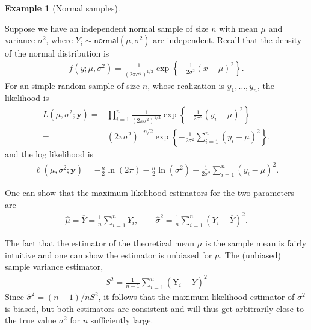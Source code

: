 \documentclass[
  11pt,
  letterpaper,
]{scrbook}
\theoremstyle{plain}
\theoremstyle{definition}
\newtheorem{example}{Example}[chapter]
\theoremstyle{definition}
\theoremstyle{remark}
\begin{document}
\begin{example}[Normal
samples]\protect\hypertarget{exm-normal-mle}{}\label{exm-normal-mle}

Suppose we have an independent normal sample of size \(n\) with mean
\(\mu\) and variance \(\sigma^2\), where
\(Y_i \sim \mathsf{normal}(\mu, \sigma^2)\) are independent. Recall that
the density of the normal distribution is \begin{align*}
f(y; \mu, \sigma^2)=\frac{1}{(2\pi \sigma^2)^{1/2}}\exp\left\{-\frac{1}{2\sigma^2}(x-\mu)^2\right\}.
\end{align*} For an simple random sample of size \(n\), whose
realization is \(y_1, \ldots, y_n\), the likelihood is \begin{align*}
L(\mu, \sigma^2; \boldsymbol{y})=&\prod_{i=1}^n\frac{1}{({2\pi \sigma^2})^{1/2}}\exp\left\{-\frac{1}{2\sigma^2}(y_i-\mu)^2\right\}\\
=&(2\pi \sigma^2)^{-n/2}\exp\left\{-\frac{1}{2\sigma^2}\sum_{i=1}^n(y_i-\mu)^2\right\}.
\end{align*} and the log likelihood is \begin{align*}
\ell(\mu, \sigma^2; \boldsymbol{y})=-\frac{n}{2}\ln(2\pi) -\frac{n}{2}\ln(\sigma^2)-\frac{1}{2\sigma^2}\sum_{i=1}^n (y_i-\mu)^2.
\end{align*}

One can show that the maximum likelihood estimators for the two
parameters are \begin{align*}
\widehat{\mu}=\overline{Y}=\frac{1}{n} \sum_{i=1}^n Y_i, \qquad \widehat{\sigma}^2=\frac{1}{n}\sum_{i=1}^n (Y_i-\overline{Y})^2.
\end{align*}

The fact that the estimator of the theoretical mean \(\mu\) is the
sample mean is fairly intuitive and one can show the estimator is
unbiased for \(\mu\). The (unbiased) sample variance estimator,
\begin{align*}
S^2=\frac{1}{n-1} \sum_{i=1}^n (\mathrm{Y}_i-\overline{Y})^2
\end{align*} Since \(\widehat{\sigma}^2=(n-1)/n S^2\), it follows that
the maximum likelihood estimator of \(\sigma^2\) is biased, but both
estimators are consistent and will thus get arbitrarily close to the
true value \(\sigma^2\) for \(n\) sufficiently large.

\end{example}
\end{document}

